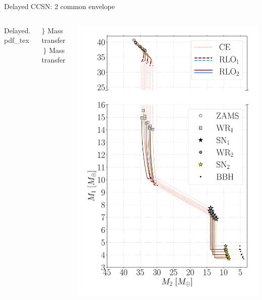 \documentclass{beamer} %
\begin{document}
\begin{frame}{Delayed CCSN: 2 common envelope}
	\begin{columns}
		\begin{column}{0.22\textwidth}
			\tiny
			\centering
			\def\svgwidth{.9\textwidth}
			{Delayed.pdf_tex} 
		\end{column}
	\hspace{0.5cm}
		\begin{column}{0.3\textwidth}
			\Large
			\vspace{1.3cm}
			$\Biggl\}$ \small Mass transfer\\
			\vspace{0.4cm}
			\Large
			$~\Biggl\}$ \small Mass transfer\\
		\end{column}
		\begin{column}{0.5\textwidth}
			\centering
			\includegraphics[width=\textwidth]{./images/del_Mass_1_Mass_0_BHBH_GW_WRBH_cyg_x-3--Ko17.pdf}
		\end{column}	
	\end{columns}
\end{frame}
\end{document}
